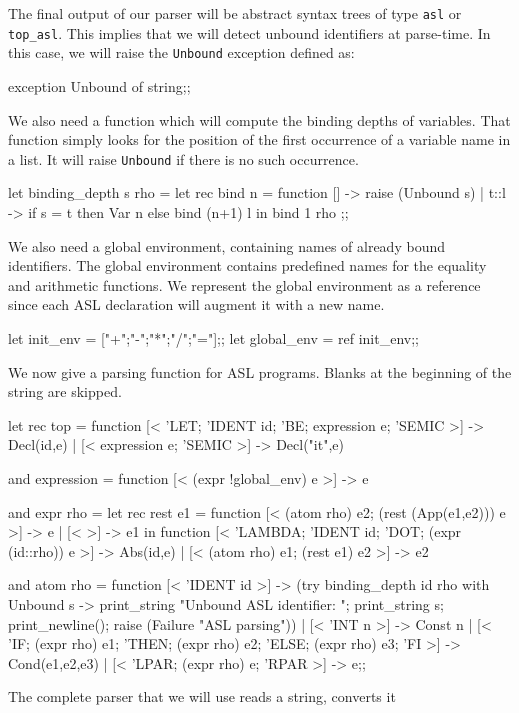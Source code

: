 The final output of our parser will be abstract syntax trees of type
{\tt asl} or \verb"top_asl". This implies that we will detect unbound
identifiers at parse-time. In this case, we will raise the {\tt Unbound}
exception defined as:
\begin{caml_example}
exception Unbound of string;;
\end{caml_example}
We also need a function which will compute the binding depths of variables.
That function simply looks for the position of the first occurrence of a
variable name in a list. It will raise {\tt Unbound} if there is no such
occurrence.
%
\begin{caml_example}
let binding_depth s rho =
 let rec bind n = function
     []  -> raise (Unbound s)
  | t::l -> if s = t then Var n else bind (n+1) l
  in bind 1 rho
;;
\end{caml_example}
We also need a global environment, containing names of already bound
identifiers.  The global environment contains predefined names for the
equality and arithmetic functions. We represent the global environment
as a reference since each ASL declaration will augment it with a new
name.
\begin{caml_example}
let init_env =  ["+";"-";"*";"/";"="];;
let global_env = ref init_env;;
\end{caml_example}
We now give a parsing function for ASL programs. Blanks at the
beginning of the string are skipped.
\begin{caml_example}
let rec top = function
    [< 'LET; 'IDENT id; 'BE; expression e; 'SEMIC >] -> Decl(id,e)
  | [< expression e; 'SEMIC >] -> Decl("it",e)

and expression = function
    [< (expr !global_env) e >] -> e

and expr rho =
  let rec rest e1 = function
          [< (atom rho) e2; (rest (App(e1,e2))) e >] -> e
        | [< >] -> e1
  in function
       [< 'LAMBDA; 'IDENT id; 'DOT; (expr (id::rho)) e >] -> Abs(id,e)
     | [< (atom rho) e1; (rest e1) e2 >] -> e2

and atom rho = function
    [< 'IDENT id >] ->
        (try binding_depth id rho with Unbound s ->
              print_string "Unbound ASL identifier: ";
              print_string s; print_newline();
              raise (Failure "ASL parsing"))
  | [< 'INT n >] -> Const n
  | [< 'IF; (expr rho) e1; 'THEN; (expr rho) e2;
       'ELSE; (expr rho) e3; 'FI >] -> Cond(e1,e2,e3)
  | [< 'LPAR; (expr rho) e; 'RPAR >] -> e;;
\end{caml_example}
The complete parser that we will use reads a string, converts it
